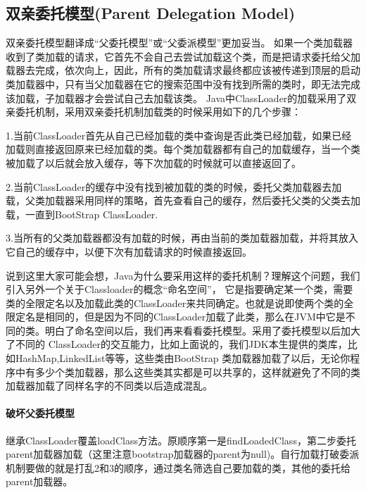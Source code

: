 
\subsection{双亲委托模型(Parent Delegation Model)}

双亲委托模型翻译成“父委托模型”或“父委派模型”更加妥当。
如果一个类加载器收到了类加载的请求，它首先不会自己去尝试加载这个类，而是把请求委托给父加载器去完成，依次向上，因此，所有的类加载请求最终都应该被传递到顶层的启动类加载器中，只有当父加载器在它的搜索范围中没有找到所需的类时，即无法完成该加载，子加载器才会尝试自己去加载该类。
Java中ClassLoader的加载采用了双亲委托机制，采用双亲委托机制加载类的时候采用如下的几个步骤：

1.当前ClassLoader首先从自己已经加载的类中查询是否此类已经加载，如果已经加载则直接返回原来已经加载的类。每个类加载器都有自己的加载缓存，当一个类被加载了以后就会放入缓存，等下次加载的时候就可以直接返回了。

2.当前ClassLoader的缓存中没有找到被加载的类的时候，委托父类加载器去加载，父类加载器采用同样的策略，首先查看自己的缓存，然后委托父类的父类去加载，一直到BootStrap ClassLoader.

3.当所有的父类加载器都没有加载的时候，再由当前的类加载器加载，并将其放入它自己的缓存中，以便下次有加载请求的时候直接返回。

说到这里大家可能会想，Java为什么要采用这样的委托机制？理解这个问题，我们引入另外一个关于Classloader的概念“命名空间”， 它是指要确定某一个类，需要类的全限定名以及加载此类的ClassLoader来共同确定。也就是说即使两个类的全限定名是相同的，但是因为不同的ClassLoader加载了此类，那么在JVM中它是不同的类。明白了命名空间以后，我们再来看看委托模型。采用了委托模型以后加大了不同的 ClassLoader的交互能力，比如上面说的，我们JDK本生提供的类库，比如HashMap,LinkedList等等，这些类由BootStrap 类加载器加载了以后，无论你程序中有多少个类加载器，那么这些类其实都是可以共享的，这样就避免了不同的类加载器加载了同样名字的不同类以后造成混乱。


\paragraph{破坏父委托模型}

继承ClassLoader覆盖loadClass方法。原顺序第一是findLoadedClass，第二步委托parent加载器加载（这里注意bootstrap加载器的parent为null)。自行加载打破委派机制要做的就是打乱2和3的顺序，通过类名筛选自己要加载的类，其他的委托给parent加载器。
